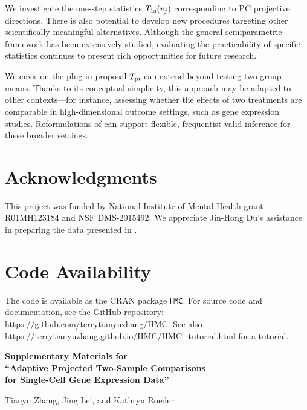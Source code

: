 \documentclass[11pt]{article}
\begin{document}
We investigate the one-step statistics $T_{\rm 1s}(v_j)$ corresponding to PC projective directions. There is also potential to develop new procedures targeting other scientifically meaningful alternatives. Although the general semiparametric framework has been extensively studied, evaluating the practicability of specific statistics continues to present rich opportunities for future research.

We envision the plug-in proposal $T_{\rm pi}$ can extend beyond testing two-group means.
Thanks to its conceptual simplicity, this approach may be adapted to other contexts---for instance, assessing whether the effects of two treatments are comparable in high-dimensional outcome settings, such as gene expression studies. Reformulations of  can support flexible, frequentist-valid inference for these broader settings.

\section*{Acknowledgments}
 This project was funded by National Institute of Mental Health grant R01MH123184 and NSF DMS-2015492. We appreciate Jin-Hong Du's assistance in preparing the data presented in .

\section*{Code Availability}
The code is available as the CRAN package \texttt{HMC}. For source code and documentation, see the GitHub repository:
\url{https://github.com/terrytianyuzhang/HMC}. See also \url{https://terrytianyuzhang.github.io/HMC/HMC_tutorial.html} for a tutorial.





\newpage

\begin{center}
\LARGE\bfseries
Supplementary Materials for\\
``Adaptive Projected Two-Sample Comparisons\\ for Single-Cell Gene Expression Data''

\vspace{1em}

\normalsize
Tianyu Zhang, Jing Lei, and Kathryn Roeder

\end{center}
\end{document}
